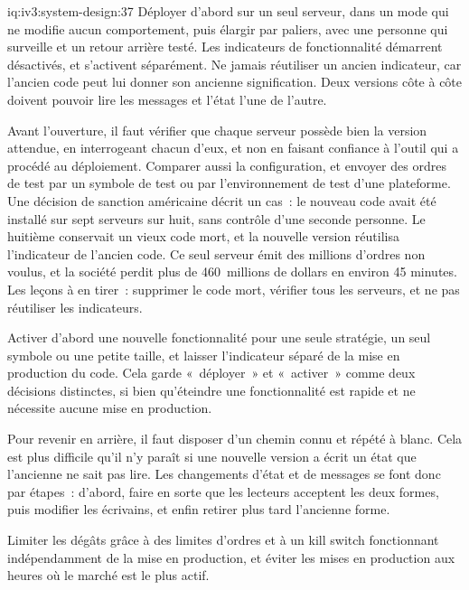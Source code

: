 \begin{solution}{iq:iv3:system-design:37}
Déployer d'abord sur un seul serveur, dans un mode qui ne modifie aucun comportement, puis élargir par paliers, avec une personne qui surveille et un retour arrière testé. Les indicateurs de fonctionnalité démarrent désactivés, et s'activent séparément. Ne jamais réutiliser un ancien indicateur, car l'ancien code peut lui donner son ancienne signification. Deux versions côte à côte doivent pouvoir lire les messages et l'état l'une de l'autre.

Avant l'ouverture, il faut vérifier que chaque serveur possède bien la version attendue, en interrogeant chacun d'eux, et non en faisant confiance à l'outil qui a procédé au déploiement. Comparer aussi la configuration, et envoyer des ordres de test par un symbole de test ou par l'environnement de test d'une plateforme. Une décision de sanction américaine décrit un cas~: le nouveau code avait été installé sur sept serveurs sur huit, sans contrôle d'une seconde personne. Le huitième conservait un vieux code mort, et la nouvelle version réutilisa l'indicateur de l'ancien code. Ce seul serveur émit des millions d'ordres non voulus, et la société perdit plus de 460~millions de dollars en environ 45 minutes. Les leçons à en tirer~: supprimer le code mort, vérifier tous les serveurs, et ne pas réutiliser les indicateurs.

Activer d'abord une nouvelle fonctionnalité pour une seule stratégie, un seul symbole ou une petite taille, et laisser l'indicateur séparé de la mise en production du code. Cela garde «~déployer~» et «~activer~» comme deux décisions distinctes, si bien qu'éteindre une fonctionnalité est rapide et ne nécessite aucune mise en production.

Pour revenir en arrière, il faut disposer d'un chemin connu et répété à blanc. Cela est plus difficile qu'il n'y paraît si une nouvelle version a écrit un état que l'ancienne ne sait pas lire. Les changements d'état et de messages se font donc par étapes~: d'abord, faire en sorte que les lecteurs acceptent les deux formes, puis modifier les écrivains, et enfin retirer plus tard l'ancienne forme.

Limiter les dégâts grâce à des limites d'ordres et à un kill switch fonctionnant indépendamment de la mise en production, et éviter les mises en production aux heures où le marché est le plus actif.

\end{solution}

